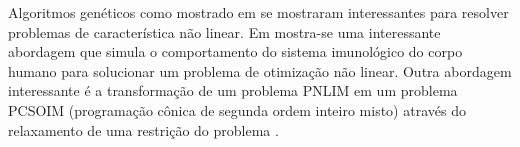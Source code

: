 Algoritmos genéticos como mostrado em  \cite{Souza2015AlgoritmoVariaveis} se mostraram interessantes para resolver problemas de característica não linear.
Em \cite{deCastro2002AnOptimization} mostra-se uma interessante abordagem que simula o comportamento do sistema imunológico do corpo humano para solucionar um problema de otimização não linear.
Outra abordagem interessante é a transformação de um problema PNLIM em um problema PCSOIM (programação cônica de segunda ordem inteiro misto) através do relaxamento de uma restrição do problema \cite{Romais2014ReconfiguracaoMista}.